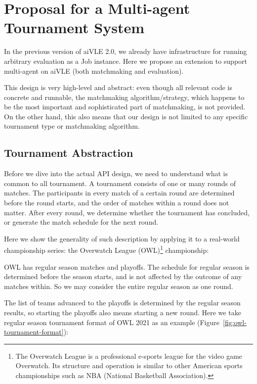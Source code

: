 \chapter{Proposal for a Multi-agent Tournament System}
\label{appendix:aivle-web_matchmaking}

In the previous version of aiVLE 2.0, we already have infrastructure for running arbitrary evaluation as a Job instance. Here we propose an extension to support multi-agent on aiVLE (both matchmaking and evaluation).

This design is very high-level and abstract: even though all relevant code is concrete and runnable, the matchmaking algorithm/strategy, which happens to be the most important and sophisticated part of matchmaking, is not provided. On the other hand, this also means that our design is not limited to any specific tournament type or matchmaking algorithm.

\section{Tournament Abstraction}
\label{as:matchmaking-api_design-tournament_abstraction}
Before we dive into the actual API design, we need to understand what is common to all tournament. A tournament consists of one or many rounds of matches. The participants in every match of a certain round are determined before the round starts, and the order of matches within a round does not matter. After every round, we determine whether the tournament has concluded, or generate the match schedule for the next round.

Here we show the generality of such description by applying it to a real-world championship series: the Overwatch League (OWL)\footnote{The Overwatch League is a professional e-sports league for the video game Overwatch. Its structure and operation is similar to other American sports championships such as NBA (National Basketball Association).} championship:

OWL has regular season matches and playoffs. The schedule for regular season is determined before the season starts, and is not affected by the outcome of any matches within. So we may consider the entire regular season as one round.

The list of teams advanced to the playoffs is determined by the regular season results, so starting the playoffs also means starting a new round. Here we take regular season tournament format of OWL 2021 as an example (Figure~\ref{fig:owl-tournament-format}):

